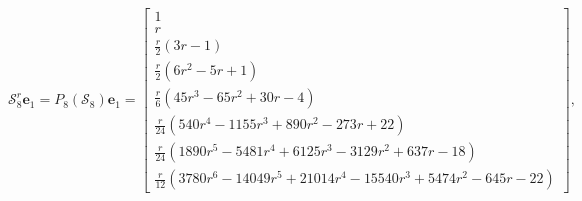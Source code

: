 \begin{example}
\begin{displaymath}
\mathcal{S}_{8}^{r}\boldsymbol{e}_{1} = {P_{ 8 }}{\left (\mathcal{S}_{ 8 } \right )}\boldsymbol{e}_{1}  =\left[\begin{matrix}1\\r\\\frac{r}{2} \left(3 r - 1\right)\\\frac{r}{2} \left(6 r^{2} - 5 r + 1\right)\\\frac{r}{6} \left(45 r^{3} - 65 r^{2} + 30 r - 4\right)\\\frac{r}{24} \left(540 r^{4} - 1155 r^{3} + 890 r^{2} - 273 r + 22\right)\\\frac{r}{24} \left(1890 r^{5} - 5481 r^{4} + 6125 r^{3} - 3129 r^{2} + 637 r - 18\right)\\\frac{r}{12} \left(3780 r^{6} - 14049 r^{5} + 21014 r^{4} - 15540 r^{3} + 5474 r^{2} - 645 r - 22\right)\end{matrix}\right],

\end{displaymath}
\end{example}
